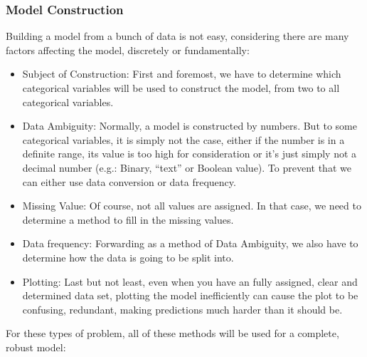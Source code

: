\documentclass[a4paper]{article}
\numberwithin{equation}{section}
\begin{document}
\newpage
\subsubsection{Model Construction}

Building a model from a bunch of data is not easy, considering there are many factors affecting the model, discretely or fundamentally:

\begin{itemize}
  \item Subject of Construction: First and foremost, we have to determine which categorical variables will be used to construct the model, from two to all categorical variables.
  \item Data Ambiguity: Normally, a model is constructed by numbers.
        But to some categorical variables, it is simply not the case, either if the number is in a definite range, its value is too high for consideration or it's just simply not a decimal number (e.g.: Binary, ``text'' or Boolean value).
        To prevent that we can either use data conversion or data frequency.
  \item Missing Value: Of course, not all values are assigned.
        In that case, we need to determine a method to fill in the missing values.
  \item Data frequency: Forwarding as a method of Data Ambiguity, we also have to determine how the data is going to be split into.
  \item Plotting: Last but not least, even when you have an fully assigned, clear and determined data set, plotting the model inefficiently can cause the plot to be confusing, redundant, making predictions much harder than it should be.
\end{itemize}

For these types of problem, all of these methods will be used for a complete, robust model:
\end{document}
